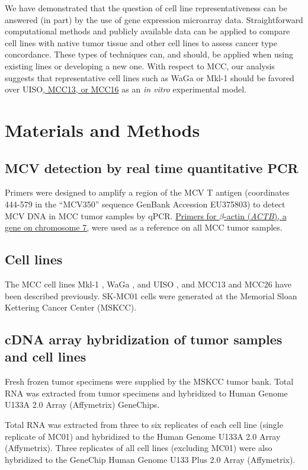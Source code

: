 \documentclass[10pt]{article}
\begin{document}
We have demonstrated that the question of cell line representativeness can be answered (in part) by the use of gene expression microarray data.
Straightforward computational methods and publicly available data can be applied to compare cell lines with native tumor tissue and other cell lines to assess cancer type concordance.
These types of techniques can, and should, be applied when using existing lines or developing a new one.
With respect to MCC, our analysis suggests that representative cell lines such as WaGa or Mkl-1 should be favored over UISO\uline{, MCC13, or MCC16} as an \emph{in vitro} experimental model.

\section*{Materials and Methods}

\subsection*{MCV detection by real time quantitative PCR}

Primers were designed to amplify a region of the MCV T antigen (coordinates 444-579 in the ``MCV350'' sequence GenBank Accession EU375803) to detect MCV DNA in MCC tumor samples by qPCR.
\uline{Primers for $\beta$-actin (\emph{ACTB}), a gene on chromosome 7,} were used as a reference on all MCC tumor samples.

\subsection*{Cell lines}
The MCC cell lines Mkl-1 \citep{Rosen1987Establishment}, WaGa \citep{Houben2010Merkel}, and UISO \citep{Ronan1993Merkel}, and MCC13 and MCC26 \citep{Leonard1995Characterisation} have been described previously.
SK-MC01 cells were generated at the Memorial Sloan Kettering Cancer Center (MSKCC).

\subsection*{cDNA array hybridization of tumor samples and cell lines}
Fresh frozen tumor specimens were supplied by the MSKCC tumor bank.
Total RNA was extracted from tumor specimens and hybridized to Human Genome U133A 2.0 Array (Affymetrix) GeneChips.

Total RNA was extracted from three to six replicates of each cell line (single replicate of MC01) and hybridized to the Human Genome U133A 2.0 Array (Affymetrix).
Three replicates of all cell lines (excluding MC01) were also hybridized to the GeneChip Human Genome U133 Plus 2.0 Array (Affymetrix).
\end{document}
